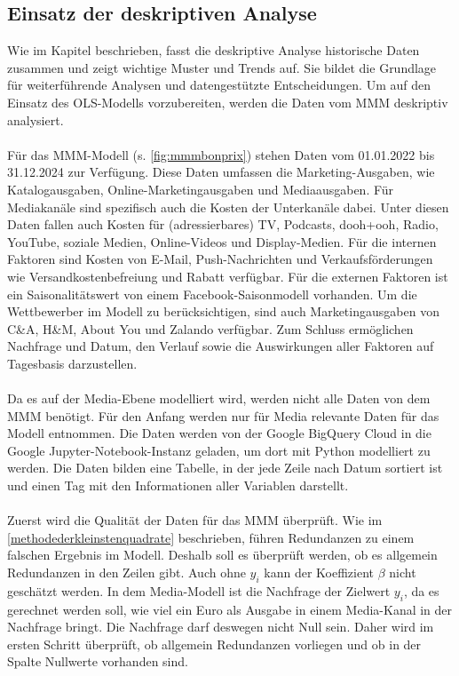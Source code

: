 \subsection{Einsatz der deskriptiven Analyse}
\label{EinsatzDerDeskriptivenAnalyse}
Wie im Kapitel  beschrieben, fasst die deskriptive Analyse historische Daten zusammen und zeigt wichtige Muster und Trends auf. Sie bildet die Grundlage für weiterführende Analysen und datengestützte Entscheidungen. Um auf den Einsatz des \ac{OLS}-Modells vorzubereiten, werden die Daten vom \ac{MMM} deskriptiv analysiert. \\\\
Für das \ac{MMM}-Modell (s. \autoref{fig:mmmbonprix}) stehen Daten vom 01.01.2022 bis 31.12.2024 zur Verfügung. Diese Daten umfassen die Marketing-Ausgaben, wie Katalogausgaben, Online-Marketingausgaben und Mediaausgaben. Für Mediakanäle sind spezifisch auch die Kosten der Unterkanäle dabei. 
Unter diesen Daten fallen auch Kosten für (adressierbares) TV, Podcasts, \ac{dooh}+\ac{ooh}, Radio, YouTube, soziale Medien, Online-Videos und Display-Medien. Für die internen Faktoren sind Kosten von E-Mail, Push-Nachrichten und Verkaufsförderungen wie Versandkostenbefreiung und Rabatt verfügbar. Für die externen Faktoren ist ein Saisonalitätswert von einem Facebook-Saisonmodell vorhanden. Um die Wettbewerber im Modell zu berücksichtigen, sind auch Marketingausgaben von C\&A, H\&M, About You und Zalando verfügbar. Zum Schluss ermöglichen Nachfrage und Datum, den Verlauf sowie die Auswirkungen aller Faktoren auf Tagesbasis darzustellen. \\\\
Da es auf der Media-Ebene modelliert wird, werden nicht alle Daten von dem \ac{MMM} benötigt. Für den Anfang werden nur für Media relevante Daten für das Modell entnommen. Die Daten werden von der Google BigQuery Cloud in die Google Jupyter-Notebook-Instanz geladen, um dort mit Python modelliert zu werden. Die Daten bilden eine Tabelle, in der jede Zeile nach Datum sortiert ist und einen Tag mit den Informationen aller Variablen darstellt. \\\\
Zuerst wird die Qualität der Daten für das \ac{MMM} überprüft. Wie im \autoref{methodederkleinstenquadrate} beschrieben, führen Redundanzen zu einem falschen Ergebnis im Modell. Deshalb soll es überprüft werden, ob es allgemein Redundanzen in den Zeilen gibt. Auch ohne \(y_i\) kann der Koeffizient $\beta$ nicht geschätzt werden. In dem Media-Modell ist die Nachfrage der Zielwert \(y_i\), da es gerechnet werden soll, wie viel ein Euro als Ausgabe in einem Media-Kanal in der Nachfrage bringt. Die Nachfrage darf deswegen nicht Null sein. Daher wird im ersten Schritt überprüft, ob allgemein Redundanzen vorliegen und ob in der Spalte  Nullwerte vorhanden sind.\\\\
